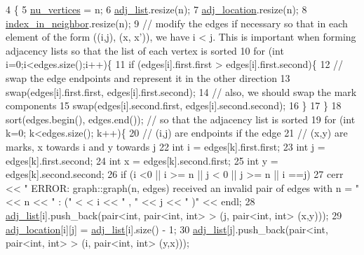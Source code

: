 \begin{DoxyCode}
4 \{ 
5   \hyperlink{classmarked__graph_acf79c6aeb8f32614cb14a5baaa6c9f9b}{nu\_vertices} = n;
6   \hyperlink{classmarked__graph_a1a0bf7ca413a278763f7c878b3b6fd6f}{adj\_list}.resize(n);
7   \hyperlink{classmarked__graph_a3ae722ea9583ad23af34d789a88ac01a}{adj\_location}.resize(n);
8   \hyperlink{classmarked__graph_aee10b537408de42476609c1e45c075d0}{index\_in\_neighbor}.resize(n);
9   \textcolor{comment}{// modify the edges if necessary so that in each element of the form ((i,j), (x, x')), we have i < j.
       This is important when forming adjacency lists so that the list of each vertex is sorted}
10   \textcolor{keywordflow}{for} (\textcolor{keywordtype}{int} i=0;i<edges.size();i++)\{
11     \textcolor{keywordflow}{if} (edges[i].first.first > edges[i].first.second)\{
12       \textcolor{comment}{// swap the edge endpoints and represent it in the other direction}
13       swap(edges[i].first.first, edges[i].first.second);
14       \textcolor{comment}{// also, we should swap the mark components}
15       swap(edges[i].second.first, edges[i].second.second);
16     \}
17   \}
18   sort(edges.begin(), edges.end()); \textcolor{comment}{// so that the adjacency list is sorted}
19   \textcolor{keywordflow}{for} (\textcolor{keywordtype}{int} k=0; k<edges.size(); k++)\{
20     \textcolor{comment}{// (i,j) are endpoints if the edge}
21     \textcolor{comment}{// (x,y) are marks, x towards i and y towards j}
22     \textcolor{keywordtype}{int} i = edges[k].first.first;
23     \textcolor{keywordtype}{int} j = edges[k].first.second;
24     \textcolor{keywordtype}{int} x = edges[k].second.first;
25     \textcolor{keywordtype}{int} y = edges[k].second.second;
26     \textcolor{keywordflow}{if} (i <0 || i >= n || j < 0 || j >= n || i ==j)
27       cerr << \textcolor{stringliteral}{" ERROR: graph::graph(n, edges) received an invalid pair of edges with n = "} << n << \textcolor{stringliteral}{" : ("} <
      < i << \textcolor{stringliteral}{" , "} << j << \textcolor{stringliteral}{" )"} << endl;
28     \hyperlink{classmarked__graph_a1a0bf7ca413a278763f7c878b3b6fd6f}{adj\_list}[i].push\_back(pair<\textcolor{keywordtype}{int}, pair<int, int> > (j, pair<int, int> (x,y)));
29     \hyperlink{classmarked__graph_a3ae722ea9583ad23af34d789a88ac01a}{adj\_location}[i][j] = \hyperlink{classmarked__graph_a1a0bf7ca413a278763f7c878b3b6fd6f}{adj\_list}[i].size() - 1;
30     \hyperlink{classmarked__graph_a1a0bf7ca413a278763f7c878b3b6fd6f}{adj\_list}[j].push\_back(pair<\textcolor{keywordtype}{int}, pair<int, int> > (i, pair<int, int> (y,x)));

\end{DoxyCode}
